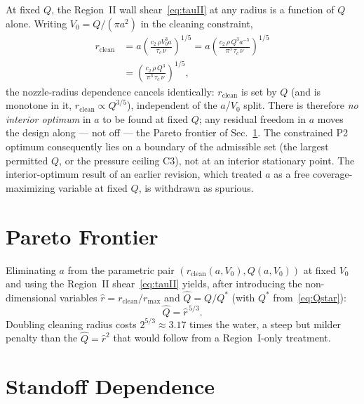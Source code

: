 \documentclass[aps,prfluids,reprint,amsmath,amssymb,floatfix]{revtex4-2}
\begin{document}
At fixed $Q$, the Region~II wall shear~\eqref{eq:tauII} at any radius is a
function of $Q$ alone. Writing $V_0 = Q/(\pi a^2)$ in the cleaning
constraint,
\begin{equation}
\begin{aligned}
  r_\mathrm{clean}
  &= a\left(\frac{c_2\,\rho V_0^3 a}{\tau_c\,\nu}\right)^{1/5}
   = a\left(\frac{c_2\,\rho\,Q^3 a^{-5}}{\pi^3\,\tau_c\,\nu}\right)^{1/5}\\[2pt]
  &= \left(\frac{c_2\,\rho\,Q^3}{\pi^3\,\tau_c\,\nu}\right)^{1/5},
\end{aligned}
  \label{eq:rcleanQ}
\end{equation}
the nozzle-radius dependence cancels identically: $r_\mathrm{clean}$ is set
by $Q$ (and is monotone in it, $r_\mathrm{clean} \propto Q^{3/5}$),
independent of the $a$/$V_0$ split. There is therefore \emph{no interior
optimum} in $a$ to be found at fixed $Q$; any residual freedom in $a$ moves
the design along --- not off --- the Pareto frontier of
Sec.~\ref{sec:pareto}. The constrained P2 optimum consequently lies on a
boundary of the admissible set (the largest permitted $Q$, or the pressure
ceiling C3), not at an interior stationary point. The interior-optimum result
of an earlier revision, which treated $a$ as a free coverage-maximizing
variable at fixed $Q$, is withdrawn as spurious.

\section{Pareto Frontier}
\label{sec:pareto}

Eliminating $a$ from the parametric pair
$(r_\mathrm{clean}(a, V_0), Q(a, V_0))$ at fixed $V_0$ and using the
Region~II shear~\eqref{eq:tauII} yields, after introducing the
non-dimensional variables $\hat r = r_\mathrm{clean}/r_\mathrm{max}$ and
$\hat Q = Q/Q^*$ (with $Q^*$ from~\eqref{eq:Qstar}):
\begin{equation}
  \hat Q = \hat r^{\,5/3}.
  \label{eq:pareto}
\end{equation}
Doubling cleaning radius costs $2^{5/3} \approx 3.17$ times the water,
a steep but milder penalty than the $\hat Q = \hat r^2$ that would follow
from a Region~I-only treatment.

\section{Standoff Dependence}
\label{sec:standoff}
\end{document}
